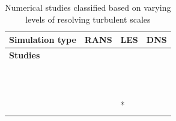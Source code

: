 \documentclass[a4paper,12pt]{elsarticle}
\begin{document}
\begin{longtable}{|m{3cm}|m{4.3cm}|m{4.4cm}|m{3.2cm}|}
    \caption{Numerical studies classified based on varying levels of resolving turbulent scales}
    \label{tab:num}\\
    \hline
    \textbf{Simulation type} & \textbf{RANS} & \textbf{LES} & \textbf{DNS} \\
    \hline
    \textbf{Studies} & \citet{ren2021numerical} & \citet{feng2020study} & \citet{giri2022colliding} \\
    
     & \citet{li2020investigating} & \citet{khosronejad2020fluid} & \citet{chong2021extended} \\
    
     & \citet{dbouk2020respiratory} & \citet{zhang2019distribution} & \citet{diwan2020understanding} \\
    
     & \citet{liu2020experimental} & \citet{berrouk2010experimental} & \citet{singhal2022virus} \\
    
     & \citet{dbouk2020coughing} & \citet{pendar2020numerical} & \citet{rosti2020fluid} \\
    
     & \citet{aliyu2021dispersion} & \citet{abkarian2020speech} &  \\
    
     & \citet{zhou2021experimental} & \citet{saarinen2015large} &  \\
    
     & \citet{mirzaie2021covid} & \citet{li2023transient} &  \\
    
     & \citet{qian2008dispersion} & \citet{liu2021simulation} &  \\
    
     & \citet{li2005role} & \citet{quintero2022reducing} &  \\
    
     & \citet{villafruela2019assessment} & \citet{buchan2020predicting} &  \\
    
     & \citet{he2011cfd} & \citet{wu2023numerical} &  \\
    
     & \citet{jiang2009investigating} & \citet{fontes2020study}* &  \\
    
     & \citet{yan2021transmission} & \citet{salinas2022improved} &  \\
    

\end{longtable}
\end{document}
